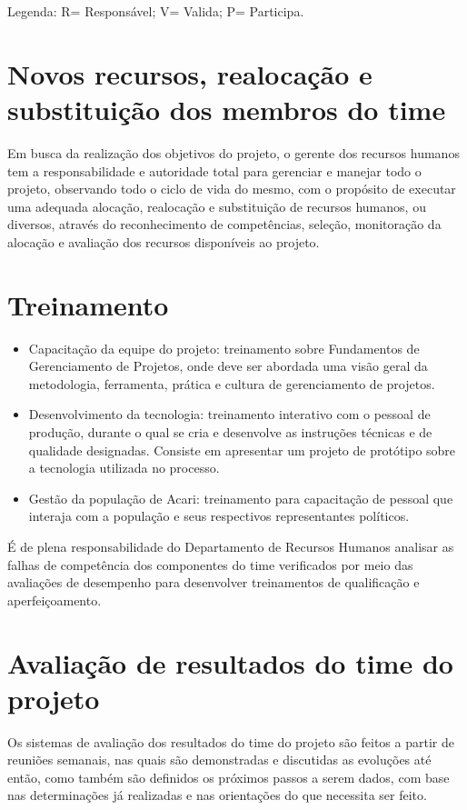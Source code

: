Legenda: R= Responsável; V= Valida; P= Participa.\\
  

\section*{Novos recursos, realocação e substituição dos membros do time}
Em busca da realização dos objetivos do projeto, o gerente dos recursos humanos tem a responsabilidade e autoridade total para gerenciar e manejar todo o projeto, observando todo o ciclo de vida do mesmo, com o propósito de executar uma adequada alocação, realocação e substituição de recursos humanos, ou diversos, através do reconhecimento de competências, seleção, monitoração da alocação e avaliação dos recursos disponíveis ao projeto.

\section*{Treinamento}
\begin{itemize}
 \item Capacitação da equipe do projeto: treinamento sobre Fundamentos de Gerenciamento de Projetos, onde deve ser abordada uma visão geral da metodologia, ferramenta, prática e cultura de gerenciamento de projetos.

 \item Desenvolvimento da tecnologia: treinamento interativo com o pessoal de produção, durante o qual se cria e desenvolve as instruções técnicas e de qualidade designadas. Consiste em apresentar um projeto de protótipo sobre a tecnologia utilizada no processo.

  \item Gestão da população de Acari: treinamento para capacitação de pessoal que interaja com a população e seus respectivos representantes políticos.
\end{itemize}

É de plena responsabilidade do Departamento de Recursos Humanos analisar as falhas de competência dos componentes do time verificados por meio das avaliações de desempenho para desenvolver treinamentos de qualificação e aperfeiçoamento.

\section*{Avaliação de resultados do time do projeto}
Os sistemas de avaliação dos resultados do time do projeto são feitos a partir de reuniões semanais, nas quais são demonstradas e discutidas as evoluções até então, como também são definidos os próximos passos a serem dados, com base nas determinações já realizadas e nas orientações do que necessita ser feito.

